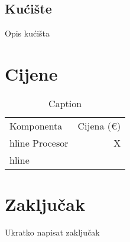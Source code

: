 \documentclass{article}
\begin{document}
    \subsection{Kućište}
    Opis kućišta

\section{Cijene}
    \begin{table}[H]
        \centering
        \begin{tabular}{|l|r|}
            \hline
            Komponenta & Cijena (€)\\hline
            Procesor & X\\hline
        \end{tabular}
        \caption{Caption}
        \label{tab:my_label}
    \end{table}
\clearpage

\section{Zaključak}
Ukratko napisat zaključak
\clearpage

\listoffigures
\end{document}
